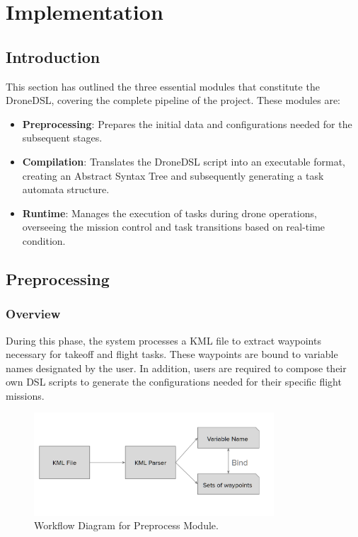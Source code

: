 \chapter{Implementation}
\label{sec:implementation}

\section{Introduction}
This section has outlined the three essential modules that constitute the DroneDSL, covering the complete pipeline of the project. These modules are:
\begin{itemize}
    \item \textbf{Preprocessing}: Prepares the initial data and configurations needed for the subsequent stages.
    \item \textbf{Compilation}: Translates the DroneDSL script into an executable format, creating an Abstract Syntax Tree and subsequently generating a task automata structure.
    \item \textbf{Runtime}: Manages the execution of tasks during drone operations, overseeing the mission control and task transitions based on real-time condition.
\end{itemize}
\section{Preprocessing}
\subsection{Overview}
During this phase, the system processes a KML file to extract waypoints necessary for takeoff and flight tasks. These waypoints are bound to variable names designated by the user. In addition, users are required to compose their own DSL scripts to generate the configurations needed for their specific flight missions.
\begin{figure}[H] %
    \centering %
    \includegraphics[width=0.8\textwidth]{Pictures/pre_flow.PNG}
    \caption{Workflow Diagram for Preprocess Module.}
    \label{fig:workflow_diagram}
\end{figure}

